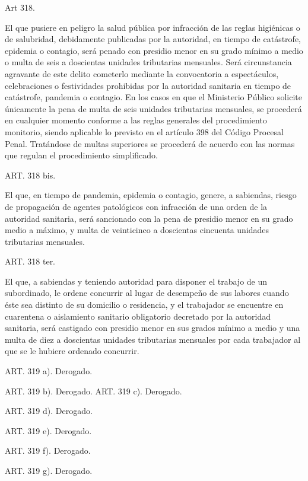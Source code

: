    Art 318.

    El que pusiere en peligro la salud pública por infracción de las reglas higiénicas o de salubridad, debidamente publicadas por la autoridad, en tiempo de catástrofe, epidemia o contagio, será penado con presidio menor en su grado mínimo a medio o multa de seis a doscientas unidades tributarias mensuales.
    Será circunstancia agravante de este delito cometerlo mediante la convocatoria a espectáculos, celebraciones o festividades prohibidas por la autoridad sanitaria en tiempo de catástrofe, pandemia o contagio.
    En los casos en que el Ministerio Público solicite únicamente la pena de multa de seis unidades tributarias mensuales, se procederá en cualquier momento conforme a las reglas generales del procedimiento monitorio, siendo aplicable lo previsto en el artículo 398 del Código Procesal Penal. Tratándose de multas superiores se procederá de acuerdo con las normas que regulan el procedimiento simplificado.







    ART. 318 bis.

    El que, en tiempo de pandemia, epidemia o contagio, genere, a sabiendas, riesgo de propagación de agentes patológicos con infracción de una orden de la autoridad sanitaria, será sancionado con la pena de presidio menor en su grado medio a máximo, y multa de veinticinco a doscientas cincuenta unidades tributarias mensuales.


    ART. 318 ter.

    El que, a sabiendas y teniendo autoridad para disponer el trabajo de un subordinado, le ordene concurrir al lugar de desempeño de sus labores cuando éste sea distinto de su domicilio o residencia, y el trabajador se encuentre en cuarentena o aislamiento sanitario obligatorio decretado por la autoridad sanitaria, será castigado con presidio menor en sus grados mínimo a medio y una multa de diez a doscientas unidades tributarias mensuales por cada trabajador al que se le hubiere ordenado concurrir.

    ART. 319 a).    Derogado.

    ART. 319 b).    Derogado.
    ART. 319 c).    Derogado.

    ART. 319 d).    Derogado.

    ART. 319 e).    Derogado.

    ART. 319 f).    Derogado.

    ART. 319 g).    Derogado.


